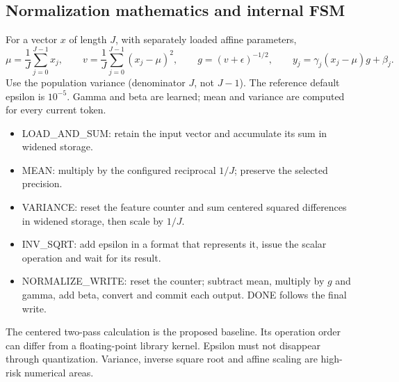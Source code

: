 \documentclass[11pt,a4paper]{article}
\begin{document}
\subsection{Normalization mathematics and internal FSM}
For a vector $x$ of length $J$, with separately loaded affine parameters,
\[
\mu=\frac{1}{J}\sum_{j=0}^{J-1}x_j,\qquad
v=\frac{1}{J}\sum_{j=0}^{J-1}(x_j-\mu)^2,\qquad
g=(v+\epsilon)^{-1/2},\qquad
y_j=\gamma_j(x_j-\mu)g+\beta_j.
\]
Use the population variance (denominator $J$, not $J-1$). The reference default epsilon is $10^{-5}$. Gamma and beta are learned; mean and variance are computed for every current token.
\begin{itemize}
\item LOAD\_AND\_SUM: retain the input vector and accumulate its sum in widened storage.
\item MEAN: multiply by the configured reciprocal $1/J$; preserve the selected precision.
\item VARIANCE: reset the feature counter and sum centered squared differences in widened storage, then scale by $1/J$.
\item INV\_SQRT: add epsilon in a format that represents it, issue the scalar operation and wait for its result.
\item NORMALIZE\_WRITE: reset the counter; subtract mean, multiply by $g$ and gamma, add beta, convert and commit each output. DONE follows the final write.
\end{itemize}
The centered two-pass calculation is the proposed baseline. Its operation order can differ from a floating-point library kernel. Epsilon must not disappear through quantization. Variance, inverse square root and affine scaling are high-risk numerical areas.

\begin{center}
\end{center}
\end{document}
